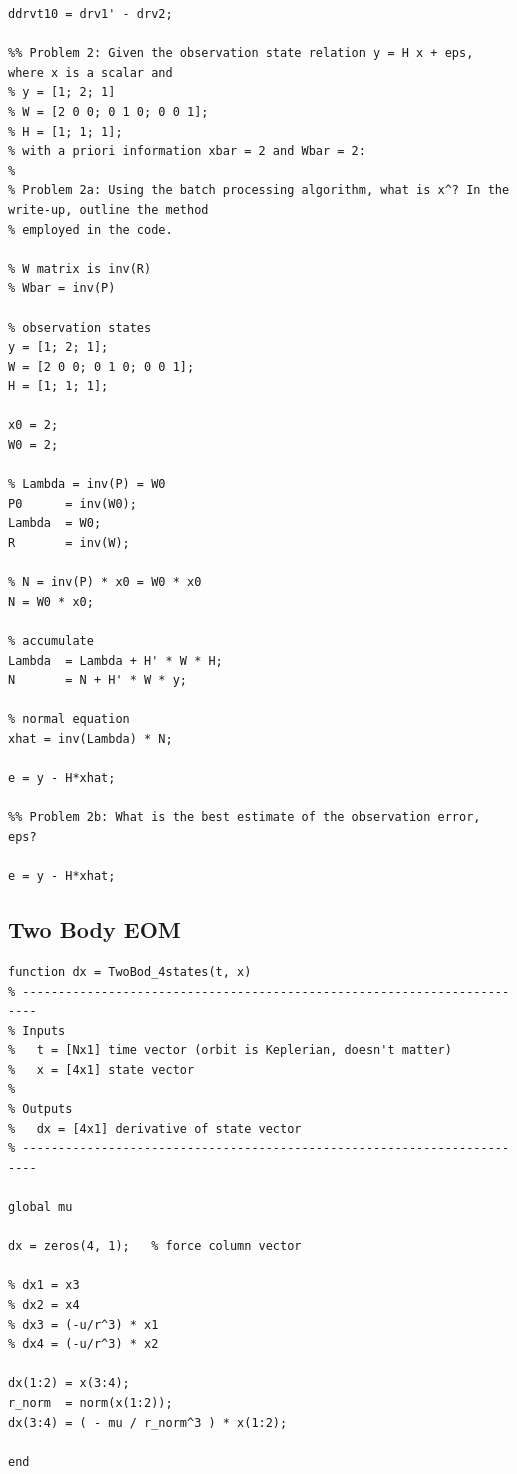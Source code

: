 \documentclass[conf]{new-aiaa}
\begin{document}
\begin{lstlisting}[basicstyle=\footnotesize]
ddrvt10 = drv1' - drv2; 

%% Problem 2: Given the observation state relation y = H x + eps, where x is a scalar and
% y = [1; 2; 1]
% W = [2 0 0; 0 1 0; 0 0 1]; 
% H = [1; 1; 1]; 
% with a priori information xbar = 2 and Wbar = 2:
% 
% Problem 2a: Using the batch processing algorithm, what is x^? In the write-up, outline the method
% employed in the code.

% W matrix is inv(R) 
% Wbar = inv(P) 

% observation states 
y = [1; 2; 1]; 
W = [2 0 0; 0 1 0; 0 0 1]; 
H = [1; 1; 1]; 

x0 = 2; 
W0 = 2; 

% Lambda = inv(P) = W0  
P0      = inv(W0); 
Lambda  = W0; 
R       = inv(W); 

% N = inv(P) * x0 = W0 * x0 
N = W0 * x0; 

% accumulate 
Lambda  = Lambda + H' * W * H; 
N       = N + H' * W * y; 

% normal equation 
xhat = inv(Lambda) * N; 

e = y - H*xhat; 

%% Problem 2b: What is the best estimate of the observation error, eps? 

e = y - H*xhat; 

\end{lstlisting}

\subsection*{Two Body EOM} 
\begin{lstlisting}
function dx = TwoBod_4states(t, x)
% ------------------------------------------------------------------------
% Inputs 
%   t = [Nx1] time vector (orbit is Keplerian, doesn't matter) 
%   x = [4x1] state vector 
% 
% Outputs 
%   dx = [4x1] derivative of state vector 
% ------------------------------------------------------------------------

global mu 

dx = zeros(4, 1);   % force column vector 

% dx1 = x3 
% dx2 = x4 
% dx3 = (-u/r^3) * x1
% dx4 = (-u/r^3) * x2

dx(1:2) = x(3:4); 
r_norm  = norm(x(1:2)); 
dx(3:4) = ( - mu / r_norm^3 ) * x(1:2); 

end 
\end{lstlisting}
\end{document}
